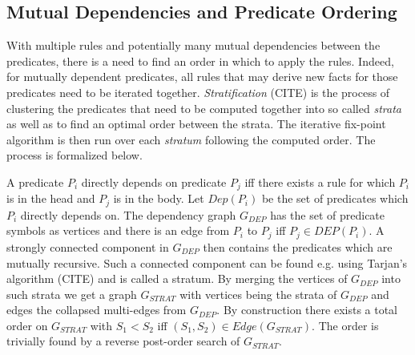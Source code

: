 \subsection{Mutual Dependencies and Predicate Ordering}
With multiple rules and potentially many mutual dependencies between the predicates, there is a need to find an order in which to apply the rules. Indeed, for mutually dependent predicates, all rules that may derive new facts for those predicates need to be iterated together. \textit{Stratification} (CITE) is the process of clustering the predicates that need to be computed together into so called \textit{strata} as well as to find an optimal order between the strata. The iterative fix-point algorithm is then run over each \textit{stratum} following the computed order. The process is formalized below.

A predicate $P_i$ directly depends on predicate $P_j$ iff there exists a rule for which $P_i$ is in the head and $P_j$ is in the body. Let $Dep(P_i)$ be the set of predicates which $P_i$ directly depends on. The dependency graph $G_{DEP}$ has the set of predicate symbols as vertices and there is an edge from $P_i$ to $P_j$ iff $P_j \in DEP(P_i)$. A strongly connected component in $G_{DEP}$ then contains the predicates which are mutually recursive. Such a connected component can be found e.g. using Tarjan's algorithm (CITE) and is called a stratum. By merging the vertices of $G_{DEP}$ into such strata we get a graph $G_{STRAT}$ with vertices being the strata of $G_{DEP}$ and edges the collapsed multi-edges from $G_{DEP}$. By construction there exists a total order on $G_{STRAT}$ with $S_1 < S_2$ iff $(S_1, S_2) \in Edge(G_{STRAT})$. The order is trivially found by a reverse post-order search of $G_{STRAT}$.
